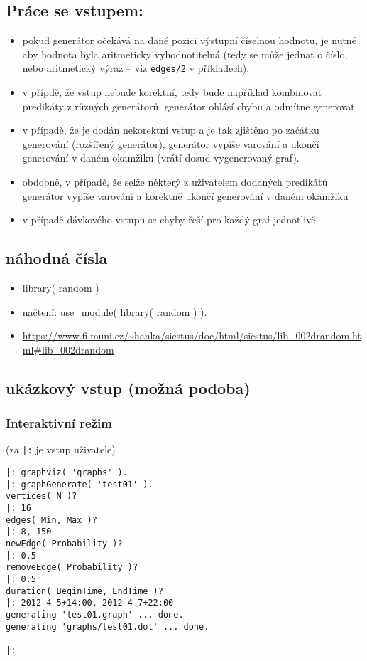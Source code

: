 \documentclass[11pt, a4paper,draft]{article}
\newcommand{\pl}[1]{\texttt{#1}} %
\theoremstyle{plain}
\theoremstyle{definition}
\theoremstyle{remark}
\begin{document}
\subsection{Práce se vstupem:}
\begin{itemize}
    \item pokud generátor očekává na dané pozici výstupní číselnou hodnotu, je nutné
    aby hodnota byla aritmeticky vyhodnotitelná (tedy se může jednat o číslo,
    nebo aritmetický výraz -- viz \pl{edges/2} v příkladech).
    \item v přípdě, že vstup nebude korektní, tedy bude například kombinovat predikáty
    z různých generátorů, generátor ohlásí chybu a odmítne generovat
    \item v případě, že je dodán nekorektní vstup a je tak zjištěno po začátku generování
    (rozšířený generátor), generátor vypíše varování a ukončí generování v daném
    okamžiku (vrátí dosud vygenerovaný graf).
    \item obdobně, v případě, že selže některý z uživatelem dodaných predikátů generátor
    vypíše varování a korektně ukončí generování v daném okamžiku
    \item v případě dávkového vstupu se chyby řeší pro každý graf jednotlivě
\end{itemize}

\subsection{náhodná čísla}
\begin{itemize}
    \item library( random )
    \item načtení: use\_module( library( random ) ).
    \item \url{https://www.fi.muni.cz/~hanka/sicstus/doc/html/sicstus/lib_002drandom.html#lib_002drandom}
\end{itemize}

\subsection{ukázkový vstup (možná podoba)}

\subsubsection{Interaktivní režim}
(za \texttt{|:} je vstup uživatele)
\begin{verbatim}
|: graphviz( 'graphs' ).
|: graphGenerate( 'test01' ).
vertices( N )?
|: 16
edges( Min, Max )?
|: 8, 150
newEdge( Probability )?
|: 0.5
removeEdge( Probability )?
|: 0.5
duration( BeginTime, EndTime )?
|: 2012-4-5+14:00, 2012-4-7+22:00
generating 'test01.graph' ... done.
generating 'graphs/test01.dot' ... done.

|:
\end{verbatim}
\end{document}
